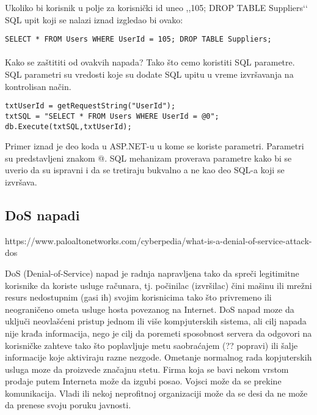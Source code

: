 \documentclass[a4paper]{article}
\begin{document}
\noindent Ukoliko bi korisnik u polje za korisnički id uneo ,,105; DROP TABLE Suppliers‘‘ SQL upit koji se nalazi iznad izgledao bi ovako:

\begin{verbatim}
SELECT * FROM Users WHERE UserId = 105; DROP TABLE Suppliers; 
\end{verbatim}

\paragraph{}
Kako se zaštititi od ovakvih napada? Tako što cemo koristiti SQL parametre. SQL parametri su vredosti koje su dodate SQL upitu u vreme izvršavanja na kontrolisan način. 

\begin{verbatim}
txtUserId = getRequestString("UserId");
txtSQL = "SELECT * FROM Users WHERE UserId = @0";
db.Execute(txtSQL,txtUserId);
\end{verbatim}

\noindent Primer iznad je deo koda u ASP.NET-u u kome se koriste parametri. Parametri su predstavljeni znakom @. SQL mehanizam proverava parametre kako bi se uverio da su ispravni i da se tretiraju bukvalno a ne kao deo SQL-a koji se izvršava.


\subsection{DoS napadi}
\label{subsec:DoS}

https://www.paloaltonetworks.com/cyberpedia/what-is-a-denial-of-service-attack-dos

DoS (Denial-of-Service) napad je radnja napravljena tako da spreči legitimitne korisnike da koriste usluge računara, tj. počinilac (izvršilac) čini mašinu ili mrežni resurs nedostupnim (gasi ih) svojim korisnicima tako što privremeno ili neograničeno ometa usluge hosta povezanog na Internet. DoS napad moze da uključi neovlašćeni pristup jednom ili više kompjuterskih sistema, ali cilj napada nije krađa informacija, nego je cilj da poremeti sposobnost servera da odgovori na korisničke zahteve tako što poplavljuje metu saobraćajem (?? popravi) ili šalje informacije koje aktiviraju razne nezgode. Ometanje normalnog rada kopjuterskih usluga moze da proizvede značajnu stetu. Firma koja se bavi nekom vrstom prodaje putem Interneta može da izgubi posao. Vojsci može da se prekine komunikacija. Vladi ili nekoj neprofitnoj organizaciji može da se desi da ne može da prenese svoju poruku javnosti.
\end{document}
